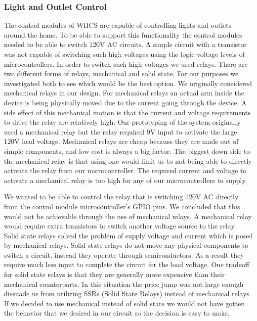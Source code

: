 \subsubsection{Light and Outlet Control}
The control modules of WHCS are capable of controlling lights and outlets
around the home. To be able to support this functionality the control modules
needed to be able to switch 120V AC circuits. A simple circuit with a transistor
was not capable of switching such high voltages using the logic voltage levels
of microcontrollers. In order to switch such high voltages we used relays.
There are two different forms of relays, mechanical and solid state. For our
purposes we investigated both to see which would be the best option. We
originally considered mechanical relays in our design. For mechanical relays an
actual arm inside the device is being physically moved due to the current going
through the device. A side effect of this mechanical motion is that the current
and voltage requirements to drive the relay are relatively high. Our
prototyping of the system originally used a mechanical relay but the relay
required 9V input to activate the large 120V load voltage. Mechanical relays
are cheap because they are made out of simple components, and low cost is
always a big factor. The biggest down side to the mechanical relay is that
using one would limit us to not being able to directly activate the relay from
our microcontroller. The required current and voltage to activate a mechanical
relay is too high for any of our microcontrollers to supply.

We wanted to be able to control the relay that is switching 120V AC directly from
the control module microcontroller{}'s GPIO pins. We concluded that this would
not be achievable through the use of mechanical relays. A mechanical relay
would require extra transistors to switch another voltage source to the relay.
Solid state relays solved the problem of supply voltage and current which is
posed by mechanical relays. Solid state relays do not move any physical
components to switch a circuit, instead they operate through semiconductors. As
a result they require much less input to complete the circuit for the load
voltage. One tradeoff for solid state relays is that they are generally more
expensive than their mechanical counterparts. In this situation the price jump
was not large enough dissuade us from utilizing SSRs (Solid State Relays)
instead of mechanical relays. If we decided to use mechanical instead of solid
state we would not have gotten the behavior that we desired in our circuit so the
decision is easy to make.

